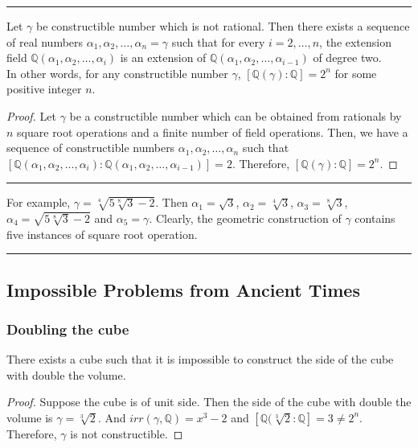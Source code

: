 \hrule\vspace{1em}
\begin{corollary}
	Let $\gamma$ be constructible number which is not rational.
	Then there exists a sequence of real numbers $\alpha_1,\alpha_2,\dots,\alpha_n = \gamma$ such that for every $i = 2,\dots,n$, the extension field $\mathbb{Q}(\alpha_1,\alpha_2,\dots,\alpha_i)$ is an extension of $\mathbb{Q}(\alpha_1,\alpha_2,\dots,\alpha_{i-1})$ of degree two.\\

	In other words, for any constructible number $\gamma$, $[\mathbb{Q}(\gamma) : \mathbb{Q}] = 2^n$ for some positive integer $n$.
\end{corollary}
\begin{proof}
	Let $\gamma$ be a constructible number which can be obtained from rationals by $n$ square root operations and a finite number of field operations.
	Then, we have a sequence of constructible numbers $\alpha_1, \alpha_2,\dots, \alpha_n$ such that $[\mathbb{Q}(\alpha_1,\alpha_2,\dots,\alpha_i) : \mathbb{Q}(\alpha_1,\alpha_2,\dots,\alpha_{i-1})] = 2$.
	Therefore, $[\mathbb{Q}(\gamma) : \mathbb{Q}] = 2^n$.
\end{proof}
\hrule\vspace{1em}
	For example, $\gamma = \sqrt[4]{5\sqrt[8]{3}-2}$.
	Then $\alpha_1 = \sqrt{3}$, $\alpha_2 = \sqrt[4]{3}$, $\alpha_3= \sqrt[8]{3}$, $\alpha_4 = \sqrt{5\sqrt[8]{3}-2}$ and $\alpha_5 = \gamma$.
	Clearly, the geometric construction of $\gamma$ contains five instances of square root operation.
\hrule\vspace{1em}
\subsection{Impossible Problems from Ancient Times}
\subsubsection{Doubling the cube}
\begin{theorem}
	There exists a cube such that it is impossible to construct the side of the cube with double the volume.
\end{theorem}
\begin{proof}
	Suppose the cube is of unit side.
	Then the side of the cube with double the volume is $\gamma = \sqrt[3]{2}$.
	And $irr(\gamma,\mathbb{Q}) = x^3-2$ and $[\mathbb{Q}(\sqrt[3]{2}:\mathbb{Q}] = 3 \ne 2^n$.
	Therefore, $\gamma$ is not constructible.
\end{proof}
